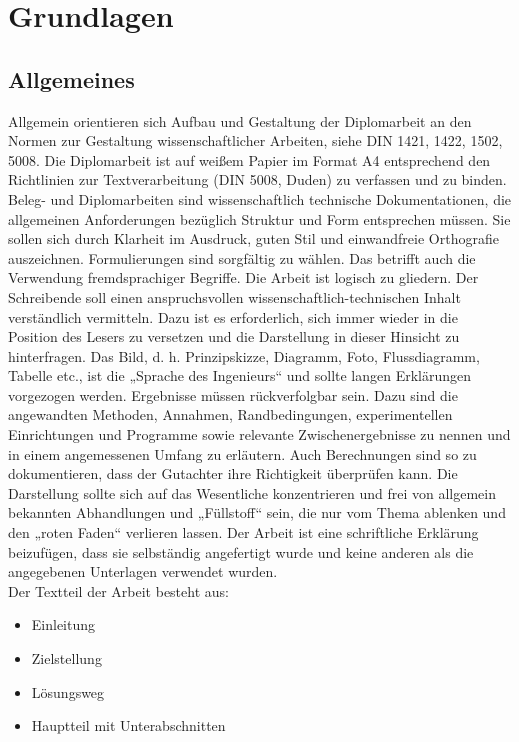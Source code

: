 
\chapter{Grundlagen}\thispagestyle{fancy}

\section{Allgemeines}
Allgemein orientieren sich Aufbau und Gestaltung der Diplomarbeit an den Normen zur Gestaltung wissenschaftlicher Arbeiten, siehe DIN 1421, 1422, 1502, 5008.
Die Diplomarbeit ist auf weißem Papier im Format A4 entsprechend den Richtlinien zur Textverarbeitung (DIN 5008, Duden) zu verfassen und zu binden.
Beleg- und Diplomarbeiten sind wissenschaftlich technische Dokumentationen, die allgemeinen Anforderungen bezüglich Struktur und Form entsprechen müssen. Sie sollen sich durch Klarheit im Ausdruck, guten Stil und einwandfreie Orthografie auszeichnen. Formulierungen sind sorgfältig zu wählen. Das betrifft auch die Verwendung fremdsprachiger Begriffe.
Die Arbeit ist logisch zu gliedern.
Der Schreibende soll einen anspruchsvollen wissenschaftlich-technischen Inhalt verständlich vermitteln. Dazu ist es erforderlich, sich immer wieder in die Position des Lesers zu versetzen und die Darstellung in dieser Hinsicht zu hinterfragen.
Das Bild, d. h. Prinzipskizze, Diagramm, Foto, Flussdiagramm, Tabelle etc., ist die „Sprache des Ingenieurs“ und sollte langen Erklärungen vorgezogen werden.
Ergebnisse müssen rückverfolgbar sein. Dazu sind die angewandten Methoden, Annahmen, Randbedingungen, experimentellen Einrichtungen und Programme sowie relevante Zwischenergebnisse zu nennen und in einem angemessenen Umfang zu erläutern.
Auch Berechnungen sind so zu dokumentieren, dass der Gutachter ihre Richtigkeit  überprüfen kann.
Die Darstellung sollte sich auf das Wesentliche konzentrieren und frei von allgemein bekannten Abhandlungen und „Füllstoff“ sein, die nur vom Thema ablenken und den „roten Faden“ verlieren lassen.
Der Arbeit ist eine schriftliche Erklärung beizufügen, dass sie selbständig angefertigt wurde und keine anderen als die angegebenen Unterlagen verwendet wurden.\\
Der Textteil der Arbeit besteht aus:
\begin{itemize}
\item Einleitung
\item Zielstellung
\item Lösungsweg
\item Hauptteil mit Unterabschnitten
\end{itemize}

